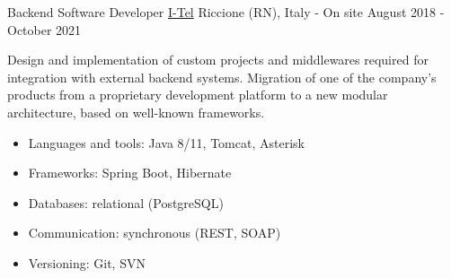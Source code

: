 \begin{cventries}

\cventry
    {Backend Software Developer} %
    {\href{https://i-tel.it}{I-Tel}} %
    {Riccione (RN), Italy - On site} %
    {August 2018 - October 2021} %
    {
      	Design and implementation of custom projects and middlewares required for integration with external backend systems.
      	Migration of one of the company's products from a proprietary development platform to a new modular architecture, based on well-known frameworks.
      	\begin{itemize}
      		\item {Languages and tools: Java 8/11, Tomcat, Asterisk}
      		\item {Frameworks: Spring Boot, Hibernate}
      		\item {Databases: relational (PostgreSQL)}
      		\item {Communication: synchronous (REST, SOAP)}
      		\item {Versioning: Git, SVN}
      	\end{itemize}
    }


\end{cventries}
